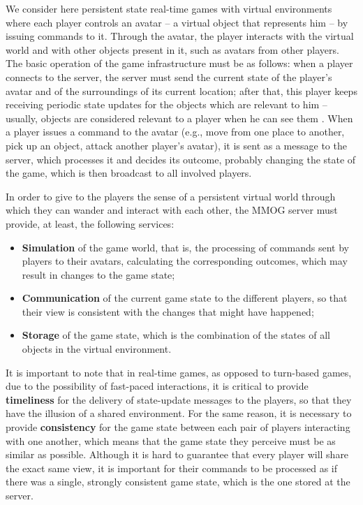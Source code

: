 \documentclass[]{usiinfprospectus}
\begin{document}
We consider here persistent state real-time games with virtual environments where each player controls an avatar -- a virtual object that represents him -- by issuing commands to it. Through the avatar, the player interacts with the virtual world and with other objects present in it, such as avatars from other players. The basic operation of the game infrastructure must be as follows: when a player connects to the server, the server must send the current state of the player's avatar and of the surroundings of its current location; after that, this player keeps receiving periodic state updates for the objects which are relevant to him -- usually, objects are considered relevant to a player when he can see them \cite{bezerra2008a3,ahmed2008dai,minson2005aim}. When a player issues a command to the avatar (e.g., move from one place to another, pick up an object, attack another player's avatar), it is sent as a message to the server, which processes it and decides its outcome, probably changing the state of the game, which is then broadcast to all involved players.

In order to give to the players the sense of a persistent virtual world through which they can wander and interact with each other, the MMOG server must provide, at least, the following services:

\begin{itemize}
	\item \textbf{Simulation} of the game world, that is, the processing of commands sent by players to their avatars, calculating the corresponding outcomes, which may result in changes to the game state;
	\item \textbf{Communication} of the current game state to the different players, so that their view is consistent with the changes that might have happened;
	\item \textbf{Storage} of the game state, which is the combination of the states of all objects in the virtual environment.
\end{itemize}

It is important to note that in real-time games, as opposed to turn-based games, due to the possibility of fast-paced interactions, it is critical to provide \textbf{timeliness} for the delivery of state-update messages to the players, so that they have the illusion of a shared environment. For the same reason, it is necessary to provide \textbf{consistency} for the game state between each pair of players interacting with one another, which means that the game state they perceive must be as similar as possible. Although it is hard to guarantee that every player will share the exact same view, it is important for their commands to be processed as if there was a single, strongly consistent game state, which is the one stored at the server. 
\end{document}
